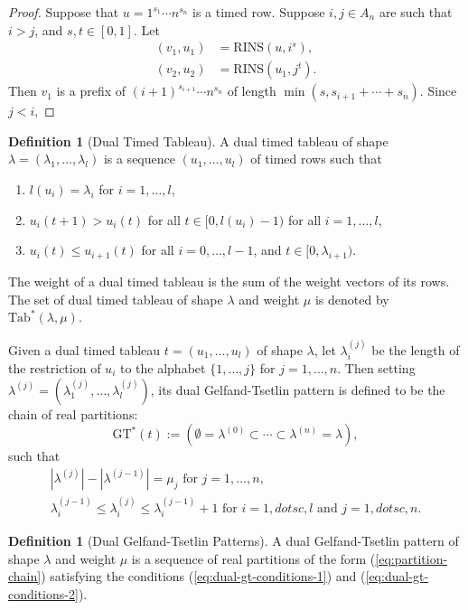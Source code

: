 \documentclass[12pt]{amsart}
\newcommand{\rowins}{\mathrm{RINS}}
\newcommand{\ttab}{\mathrm{Tab}}
\newcommand{\GT}{\mathrm{GT}}
\theoremstyle{definition}
\newtheorem{definition}[theorem]{Definition}
\begin{document}
\begin{proof}
  Suppose that $u=1^{s_1}\dotsb n^{s_n}$ is a timed row.
  Suppose $i,j\in A_n$ are such that $i>j$, and $s,t\in [0,1]$.
  Let
  \begin{align*}
    (v_1, u_1) & = \rowins(u, i^s),\\
    (v_2, u_2) & = \rowins(u_1, j^t).
  \end{align*}
  Then $v_1$ is a prefix of $(i+1)^{s_{i+1}} \dotsb n^{s_n}$ of length $\min(s, s_{i+1}+\dotsb+s_n)$.
  Since $j<i$, 
\end{proof}
\begin{definition}
  [Dual Timed Tableau]
  A dual timed tableau of shape $\lambda=(\lambda_1,\dotsc,\lambda_l)$ is a sequence $(u_1,\dotsc,u_l)$ of timed rows such that
  \begin{enumerate}
  \item $l(u_i)=\lambda_i$ for $i=1,\dotsc,l$,
  \item $u_i(t+1)>u_i(t)$ for all $t\in [0, l(u_i)-1)$ for all $i=1,\dotsc,l$,
  \item $u_i(t)\leq u_{i+1}(t)$ for all $i=0,\dotsc,l-1$, and $t\in [0,\lambda_{i+1})$.
  \end{enumerate}
  The weight of a dual timed tableau is the sum of the weight vectors of its rows.
  The set of dual timed tableau of shape $\lambda$ and weight $\mu$ is denoted by $\ttab^*(\lambda,\mu)$.
\end{definition}
Given a dual timed tableau $t=(u_1,\dotsc,u_l)$ of shape $\lambda$, let $\lambda^{(j)}_i$ be the length of the restriction of $u_i$ to the alphabet $\{1,\dotsc,j\}$ for $j=1,\dotsc,n$.
Then setting $\lambda^{(j)} = (\lambda^{(j)}_1,\dotsc,\lambda^{(j)}_l)$, its dual Gelfand-Tsetlin pattern is defined to be the chain of real partitions:
\begin{equation}
  \label{eq:partition-chain}
  \GT^*(t) := (\emptyset = \lambda^{(0)} \subset \dotsb \subset \lambda^{(n)} = \lambda),
\end{equation}
such that
\begin{gather}
  \label{eq:dual-gt-conditions-1}
  |\lambda^{(j)}| - |\lambda^{(j-1)}| = \mu_j \text{ for } j=1,\dotsc,n,\\
  \label{eq:dual-gt-conditions-2}
  \lambda^{(j-1)}_i \leq \lambda^{(j)}_i \leq \lambda^{(j-1)}_i + 1 \text{ for } i=1,dotsc,l \text{ and } j=1,dotsc, n.
\end{gather}
\begin{definition}
  [Dual Gelfand-Tsetlin Patterns]
  A dual Gelfand-Tsetlin pattern of shape $\lambda$ and weight $\mu$ is a sequence of real partitions of the form
  (\ref{eq:partition-chain}) satisfying the conditions (\ref{eq:dual-gt-conditions-1}) and (\ref{eq:dual-gt-conditions-2}).
\end{definition}
\end{document}
